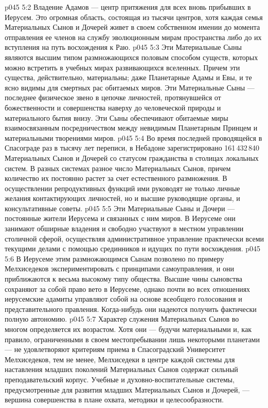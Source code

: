 \vs p045 5:2 Владение Адамов --- центр притяжения для всех вновь прибывших в Иерусем. Это огромная область, состоящая из тысячи центров, хотя каждая семья Материальных Сынов и Дочерей живет в своем собственном имении до момента отправления ее членов на службу эволюционным мирам пространства либо до их вступления на путь восхождения к Раю.
\vs p045 5:3 Эти Материальные Сыны являются высшим типом размножающихся половым способом существ, которых можно встретить в учебных мирах развивающихся вселенных. Причем эти существа, действительно, материальны; даже Планетарные Адамы и Евы, и те ясно видимы для смертных рас обитаемых миров. Эти Материальные Сыны --- последнее физическое звено в цепочке личностей, протянувшейся от божественности и совершенства наверху до человеческой природы и материального бытия внизу. Эти Сыны обеспечивают обитаемые миры взаимосвязанным посредничеством между невидимым Планетарным Принцем и материальными творениями миров.
\vs p045 5:4 \pc Во время последней проводящейся в Спасограде раз в тысячу лет переписи, в Небадоне зарегистрировано 161\,432\,840 Материальных Сынов и Дочерей со статусом гражданства в столицах локальных систем. В разных системах разное число Материальных Сынов, причем количество их постоянно растет за счет естественного размножения. В осуществлении репродуктивных функций ими руководят не только личные желания контактирующих личностей, но и высшие руководящие органы, и консультативные советы.
\vs p045 5:5 \pc Эти Материальные Сыны и Дочери --- постоянные жители Иерусема и связанных с ним миров. В Иерусеме они занимают обширные владения и свободно участвуют в местном управлении столичной сферой, осуществляя административное управление практически всеми текущими делами с помощью срединников и идущих по пути восхождения.
\vs p045 5:6 В Иерусеме этим размножающимся Сынам позволено по примеру Мелхиседеков экспериментировать с принципами самоуправления, и они приближаются к весьма высокому типу общества. Высшие чины сыновства сохраняют за собой право вето в Иерусеме, однако почти во всех отношениях иерусемские адамиты управляют собой на основе всеобщего голосования и представительного правления. Когда\hyp{}нибудь они надеются получить фактически полную автономию.
\vs p045 5:7 Характер служения Материальных Сынов во многом определяется их возрастом. Хотя они --- будучи материальными и, как правило, ограниченными в своем местопребывании лишь некоторыми планетами --- не удовлетворяют критериям приема в Спасоградский Университет Мелхиседеков, тем не менее, Мелхиседеки в центре каждой системы для наставления младших поколений Материальных Сынов содержат сильный преподавательский корпус. Учебные и духовно\hyp{}воспитательные системы, предусмотренные для развития младших Материальных Сынов и Дочерей, --- вершина совершенства в плане охвата, методики и целесообразности.
